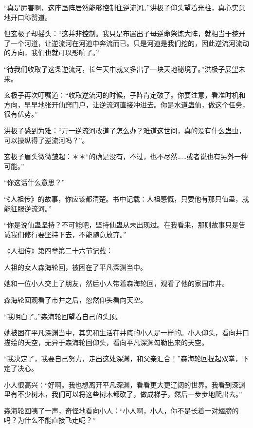 
\begin{this_body}



“真是厉害啊，这座蛊阵居然能够控制住逆流河。”洪极子仰头望着光柱，真心实意地开口称赞道。

但玄极子却摇头：“这并非控制。我只是布置出子母逆命祭炼大阵，就相当于挖开了一个河道，让逆流河在河道中奔流而已。只是河道是我们挖的，因此逆流河流动的方向，我们也就可以影响了。”

“待我们收取了这条逆流河，长生天中就又多出了一块天地秘境了。”洪极子展望未来。

玄极子再次叮嘱道：“收取逆流河的时候，子阵肯定破了。你要注意，看准时机和方向，早早地张开仙窍门户，让逆流河直接冲进去。你是水道蛊仙，做这个任务，很有优势。”

洪极子感到为难：“万一逆流河改道了怎么办？难道这世间，真的没有什么蛊虫，可以操纵得了逆流河吗？”。

玄极子眉头微微皱起：＊＊“的确是没有，不过，也不尽然……或者说也有另外一种可能。”

“你这话什么意思？”

“《人祖传》的故事，你应该都清楚。书中记载：人祖感慨，只要他有那只仙蛊，就能征服逆流河。”

“你是说仙蛊坚持？不可能吧，坚持仙蛊从未出现过。在我看来，那则故事只是告诫我们修行要坚持下去，不能随意放弃。”

《人祖传》第四章第二十六节记载：

人祖的女人森海轮回，被困在了平凡深渊当中。

她和一位小人交上了朋友，然后小人带着森海轮回，观看了他的家园市井。

森海轮回观看了市井之后，忽然仰头看向天空。

“我明白了。”森海轮回望着自己的头顶。

她被困在平凡深渊当中，其实和生活在井底的小人是一样的。小人仰头，看向井口描绘的天空，无异于森海轮回仰头，看向平凡深渊勾勒出来的天空。

“我决定了，我要自己努力，走出这处深渊，和父亲汇合！”森海轮回捏起双拳，下定了决心。

小人很高兴：“好啊。我也想离开平凡深渊，看看更大更辽阔的世界。我看到深渊里有不少树木，我们可以将这些树木都砍了，做成梯子，然后一步步地爬出去。”

森海轮回咦了一声，奇怪地看向小人：“小人啊，小人，你不是长着一对翅膀的吗？为什么不能直接飞走呢？”


\end{this_body}
